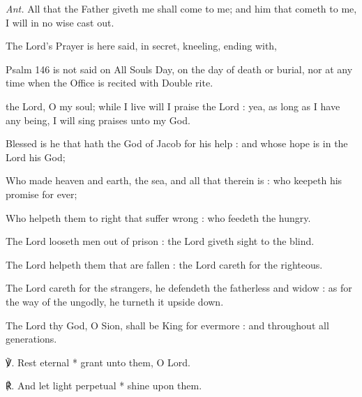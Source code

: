 \par\noindent
	\textit{Ant.} All that the Father giveth me shall come to me; and him that cometh to me, I will in no wise cast out.

\begin{rubric}
    {The Lord's Prayer is here said, in secret, kneeling, ending with,}
\end{rubric}

\begin{rubric}
{Psalm 146 is not said on All Souls Day, on the day of death or burial, nor at any time when the Office is recited with Double rite.}
\end{rubric}
 the Lord, O my soul; while I live will I praise the Lord : yea, as long as I have any being, I will sing praises unto my God.\par
{}
Blessed is he that hath the God of Jacob for his help : and whose hope is in the Lord his God;\par
{}Who made heaven and earth, the sea, and all that therein is : who keepeth his promise for ever;\par
{}Who helpeth them to right that suffer wrong : who feedeth the hungry.\par
{}The Lord looseth men out of prison : the Lord giveth sight to the blind.\par
{}The Lord helpeth them that are fallen : the Lord careth for the righteous.\par
{}The Lord careth for the strangers, he defendeth the fatherless and widow : as for the way of the ungodly, he turneth it upside down.\par
{}The Lord thy God, O Sion, shall be King for evermore : and throughout all generations.
\par
℣. Rest eternal * grant unto them, O Lord.\par
℟. And let light perpetual * shine upon them.

